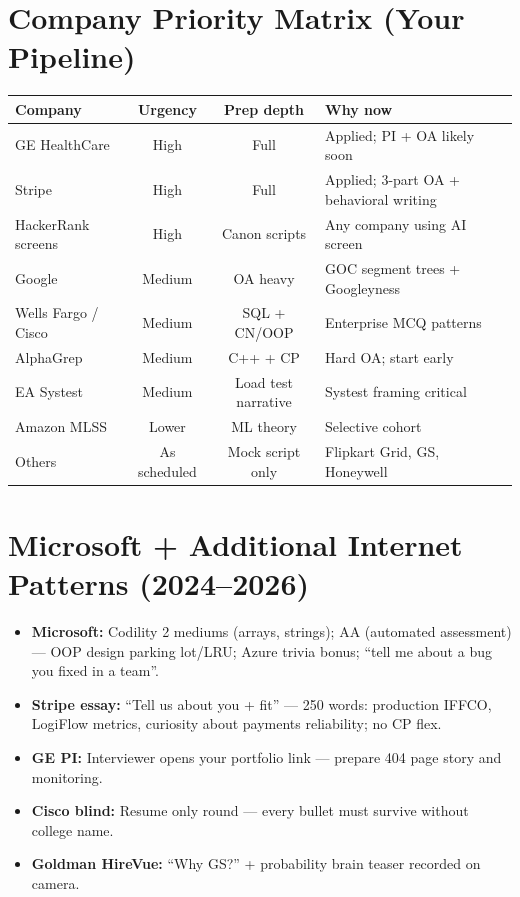 \documentclass[9pt,a4paper]{article}
\begin{document}
\newpage
\section{Company Priority Matrix (Your Pipeline)}
\begin{tabularx}{\textwidth}{@{}lccX@{}}
\toprule
\textbf{Company} & \textbf{Urgency} & \textbf{Prep depth} & \textbf{Why now} \\
\midrule
GE HealthCare & High & Full & Applied; PI + OA likely soon \\
Stripe & High & Full & Applied; 3-part OA + behavioral writing \\
HackerRank screens & High & Canon scripts & Any company using AI screen \\
Google & Medium & OA heavy & GOC segment trees + Googleyness \\
Wells Fargo / Cisco & Medium & SQL + CN/OOP & Enterprise MCQ patterns \\
AlphaGrep & Medium & C++ + CP & Hard OA; start early \\
EA Systest & Medium & Load test narrative & Systest framing critical \\
Amazon MLSS & Lower & ML theory & Selective cohort \\
Others & As scheduled & Mock script only & Flipkart Grid, GS, Honeywell \\
\bottomrule
\end{tabularx}

\section{Microsoft + Additional Internet Patterns (2024--2026)}
\begin{itemize}
  \item \textbf{Microsoft:} Codility 2 mediums (arrays, strings); AA (automated assessment) --- OOP design parking lot/LRU; Azure trivia bonus; ``tell me about a bug you fixed in a team''.
  \item \textbf{Stripe essay:} ``Tell us about you + fit'' --- 250 words: production IFFCO, LogiFlow metrics, curiosity about payments reliability; no CP flex.
  \item \textbf{GE PI:} Interviewer opens your portfolio link --- prepare 404 page story and monitoring.
  \item \textbf{Cisco blind:} Resume only round --- every bullet must survive without college name.
  \item \textbf{Goldman HireVue:} ``Why GS?'' + probability brain teaser recorded on camera.
\end{itemize}
\end{document}
